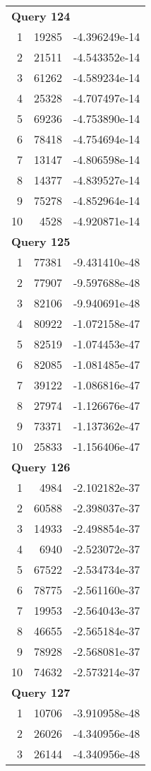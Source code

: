 \begin{longtable}[{p}]{@{}rrp{}@{}}
\midrule
\multicolumn{3}{l}{\bfseries Query 124} \\
1 & 19285 & -4.396249e-14 \\
2 & 21511 & -4.543352e-14 \\
3 & 61262 & -4.589234e-14 \\
4 & 25328 & -4.707497e-14 \\
5 & 69236 & -4.753890e-14 \\
6 & 78418 & -4.754694e-14 \\
7 & 13147 & -4.806598e-14 \\
8 & 14377 & -4.839527e-14 \\
9 & 75278 & -4.852964e-14 \\
10 & 4528 & -4.920871e-14 \\
\midrule
\multicolumn{3}{l}{\bfseries Query 125} \\
1 & 77381 & -9.431410e-48 \\
2 & 77907 & -9.597688e-48 \\
3 & 82106 & -9.940691e-48 \\
4 & 80922 & -1.072158e-47 \\
5 & 82519 & -1.074453e-47 \\
6 & 82085 & -1.081485e-47 \\
7 & 39122 & -1.086816e-47 \\
8 & 27974 & -1.126676e-47 \\
9 & 73371 & -1.137362e-47 \\
10 & 25833 & -1.156406e-47 \\
\midrule
\multicolumn{3}{l}{\bfseries Query 126} \\
1 & 4984 & -2.102182e-37 \\
2 & 60588 & -2.398037e-37 \\
3 & 14933 & -2.498854e-37 \\
4 & 6940 & -2.523072e-37 \\
5 & 67522 & -2.534734e-37 \\
6 & 78775 & -2.561160e-37 \\
7 & 19953 & -2.564043e-37 \\
8 & 46655 & -2.565184e-37 \\
9 & 78928 & -2.568081e-37 \\
10 & 74632 & -2.573214e-37 \\
\midrule
\multicolumn{3}{l}{\bfseries Query 127} \\
1 & 10706 & -3.910958e-48 \\
2 & 26026 & -4.340956e-48 \\
3 & 26144 & -4.340956e-48 \\

\end{longtable}
